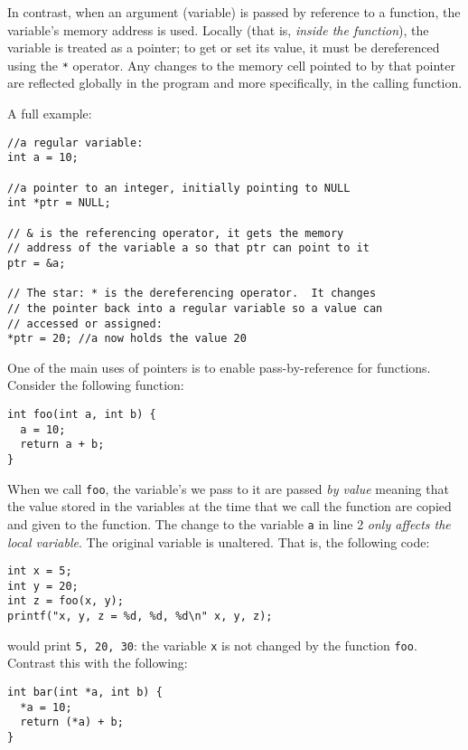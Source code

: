 \documentclass[12pt]{scrartcl}
\begin{document}
In contrast, when an argument (variable) is passed by reference to a 
function, the variable's memory address is used.  Locally (that is, 
\emph{inside the function}), the variable 
is treated as a pointer; to get or set its value, it must be dereferenced 
using the \texttt{*} operator.  Any changes to the memory cell pointed to by 
that pointer are reflected globally in the program and more specifically, 
in the calling function.

A full example:

\begin{verbatim}
//a regular variable:
int a = 10; 

//a pointer to an integer, initially pointing to NULL
int *ptr = NULL; 

// & is the referencing operator, it gets the memory 
// address of the variable a so that ptr can point to it
ptr = &a; 

// The star: * is the dereferencing operator.  It changes 
// the pointer back into a regular variable so a value can 
// accessed or assigned:
*ptr = 20; //a now holds the value 20
\end{verbatim}

One of the main uses of pointers is to enable pass-by-reference 
for functions.  Consider the following function:

\begin{verbatim}
int foo(int a, int b) {
  a = 10;
  return a + b;
}
\end{verbatim}

When we call \texttt{foo}, the variable's we pass to it are passed
\emph{by value} meaning that the value stored in the variables at the
time that we call the function are copied and given to the function.  The
change to the variable \texttt{a} in line 2 \emph{only affects
the local variable}.  The original variable is unaltered.  That is, the following
code:

\begin{verbatim}
int x = 5;
int y = 20;
int z = foo(x, y);
printf("x, y, z = %d, %d, %d\n" x, y, z);
\end{verbatim}

would print \texttt{5, 20, 30}: the variable \texttt{x} is not
changed by the function \texttt{foo}.  Contrast this with the following:

\begin{verbatim}
int bar(int *a, int b) {
  *a = 10;
  return (*a) + b;
}
\end{verbatim}
\end{document}
